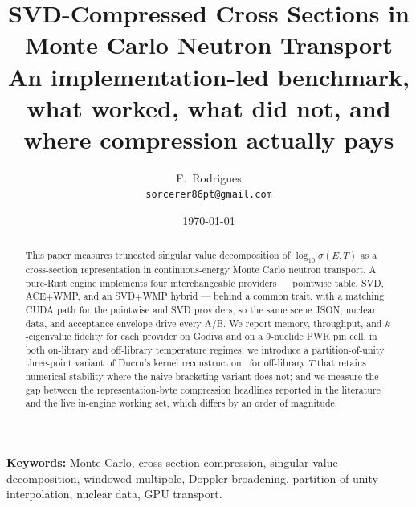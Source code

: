 \title{SVD-Compressed Cross Sections in Monte Carlo
Neutron Transport\\[0.3em]
\normalsize An implementation-led benchmark, what
worked, what did not, and where compression actually pays}

\author{F.~Rodrigues\\
\small\texttt{sorcerer86pt@gmail.com}}
\date{\today}
\maketitle

\begin{abstract}
This paper measures truncated singular value decomposition
of $\log_{10}\sigma(E,T)$ as a cross-section representation
in continuous-energy Monte Carlo neutron transport. A
pure-Rust engine implements four interchangeable providers
--- pointwise table, SVD, ACE$+$WMP, and an SVD$+$WMP
hybrid --- behind a common trait, with a matching CUDA path
for the pointwise and SVD providers, so the same scene JSON,
nuclear data, and acceptance envelope drive every A/B. We
report memory, throughput, and $k$-eigenvalue fidelity for
each provider on Godiva and on a $9$-nuclide PWR pin cell,
in both on-library and off-library temperature regimes; we
introduce a partition-of-unity three-point variant of Ducru's
kernel reconstruction~\cite{ducru2017} for off-library $T$
that retains numerical stability where the naive bracketing
variant does not; and we measure the gap between the
representation-byte compression headlines reported in the
literature and the live in-engine working set, which differs
by an order of magnitude.
\end{abstract}

\vspace{0.3em}
\noindent\textbf{\small Keywords:} \small Monte Carlo,
cross-section compression, singular value decomposition,
windowed multipole, Doppler broadening, partition-of-unity
interpolation, nuclear data, GPU transport.
